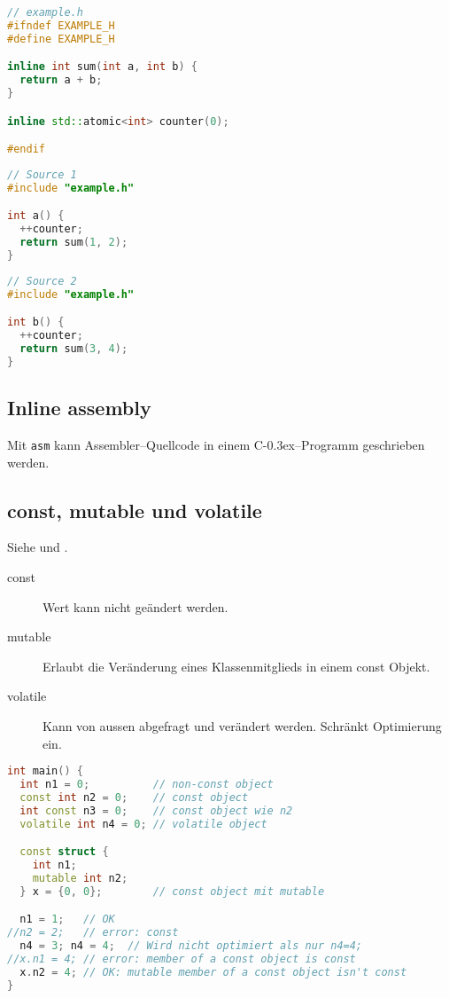 \documentclass[10pt,twocolumn]{scrartcl}
\newcommand*\cpp{C\kern-0.3ex\raisebox{0.17ex}{\texttt{+\kern-0.3ex+}}}
\begin{document}
\begin{lstlisting}[language=C++]
// example.h
#ifndef EXAMPLE_H
#define EXAMPLE_H

inline int sum(int a, int b) {
  return a + b;
}

inline std::atomic<int> counter(0);

#endif
\end{lstlisting}

\begin{lstlisting}[language=C++]
// Source 1
#include "example.h"

int a() {
  ++counter;
  return sum(1, 2);
}
\end{lstlisting}

\begin{lstlisting}[language=C++]
// Source 2
#include "example.h"

int b() {
  ++counter;
  return sum(3, 4);
}
\end{lstlisting}

\subsection{Inline assembly}

Mit \lstinline|asm| kann Assembler--Quellcode in einem \cpp{}--Programm
geschrieben werden.

\subsection{const, mutable und volatile}

Siehe  und .

\begin{description}
  \item[const] Wert kann nicht geändert werden.
  \item[mutable] Erlaubt die Veränderung eines Klassenmitglieds in einem const Objekt.
  \item[volatile] Kann von aussen abgefragt und verändert werden. Schränkt Optimierung ein.
\end{description}

\begin{lstlisting}[language=C++]
int main() {
  int n1 = 0;          // non-const object
  const int n2 = 0;    // const object
  int const n3 = 0;    // const object wie n2
  volatile int n4 = 0; // volatile object

  const struct {
    int n1;
    mutable int n2;
  } x = {0, 0};        // const object mit mutable

  n1 = 1;   // OK
//n2 = 2;   // error: const
  n4 = 3; n4 = 4;  // Wird nicht optimiert als nur n4=4;
//x.n1 = 4; // error: member of a const object is const
  x.n2 = 4; // OK: mutable member of a const object isn't const
}
\end{lstlisting}
\end{document}
